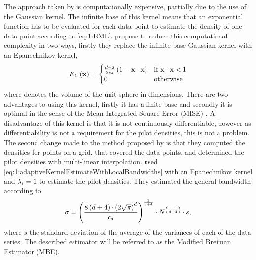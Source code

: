 	The approach taken by \citeauthor{breiman1977variable} is computationally expensive, partially due to the use of the Gaussian kernel. The infinite base of this kernel means that an exponential function has to be evaluated for each data point to estimate the density of one data point according to \cref{eq:1:BML}. \textcite{wilkinson1995dataplot} propose to reduce this computational complexity in two ways, firstly they replace the infinite base Gaussian kernel with an Epanechnikov kernel,
	\begin{equation}
		\varKernel[\varEpan]{\varPattern} = 
		\begin{cases}
			\frac{\varDim + 2}{2\varUnitSphere{\varDim}} \left( 1 - \varPattern \cdot \varPattern \right) & \text{if } \varPattern \cdot \varPattern < 1\\
			0 & \text{otherwise}
		\end{cases}
	\end{equation}
	where \varUnitSphere{\varDim} denotes the volume of the unit sphere in \varDim dimensions. There are two advantages to using this kernel, firstly it has a finite base and secondly it is optimal in the sense of the Mean Integrated Square Error (MISE) \cite{epanechnikov1969non}. A disadvantage of this kernel is that it is not continuously differentiable, however as differentiability is not a requirement for the pilot densities, this is not a problem.
	The second change \textcite{wilkinson1995dataplot} made to the method proposed by \textcite{breiman1977variable} is that they computed the densities for points on a grid, that covered the data points, and determined the pilot densities with multi-linear interpolation. \citeauthor{wilkinson1995dataplot} used \cref{eq:1:adaptiveKernelEstimateWithLocalBandwidths} with an Epanechnikov kernel and $\lambda_{i} = 1$ to estimate the pilot densities. They estimated the general bandwidth according to
		\begin{equation}\label{eq:1:wilkinsonHOpt}
			\sigma = \left(\frac{8\left(d + 4\right) \cdot \left(2 \sqrt{\pi}\right)^d}{c_{d}}\right)^{\frac{1}{d + 4}}\cdot N^{\left(\frac{-1}{d + 4}\right)} \cdot s,
		\end{equation}
	where $s$ the standard deviation of the average of the variances of each of the data series. The described estimator will be referred to as the Modified Breiman Estimator (MBE).  

